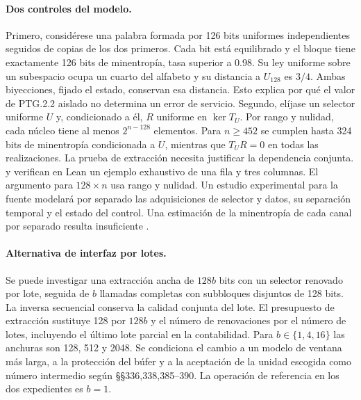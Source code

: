 \paragraph{Dos controles del modelo.}
Primero, considérese una palabra formada por 126 bits uniformes independientes
seguidos de copias de los dos primeros. Cada bit está equilibrado y el bloque
tiene exactamente 126 bits de minentropía, tasa superior a 0.98.
Su ley uniforme sobre un subespacio ocupa un cuarto del alfabeto y su distancia
a \(U_{128}\) es \(3/4\). Ambas biyecciones, fijado el estado, conservan esa
distancia. Esto explica por qué el valor de PTG.2.2 aislado no determina
un error de servicio. Segundo, elíjase un selector uniforme \(U\) y,
condicionado a él, \(R\) uniforme en \(\ker T_U\).
Por rango y nulidad, cada núcleo tiene al menos \(2^{n-128}\) elementos.
Para \(n\ge452\) se cumplen hasta 324 bits de minentropía condicionada
a \(U\), mientras que \(T_UR=0\) en todas las realizaciones. La prueba de
extracción necesita justificar la dependencia conjunta. 
y  verifican en Lean un ejemplo exhaustivo
de una fila y tres columnas. El argumento para \(128\times n\) usa rango y
nulidad. Un estudio experimental para la fuente modelará por separado las
adquisiciones de selector y datos, su separación temporal y el estado del
control. Una estimación de la minentropía de cada canal por separado
resulta insuficiente \cite[§§335, 338 y 951--955]{ais}\cite{lhl}.

\paragraph{Alternativa de interfaz por lotes.}
Se puede investigar una extracción ancha de \(128b\) bits con un selector
renovado por lote, seguida de \(b\) llamadas completas con subbloques
disjuntos de 128 bits. La inversa secuencial conserva la calidad conjunta
del lote. El presupuesto de extracción sustituye 128 por \(128b\) y el
número de renovaciones por el número de lotes, incluyendo el último lote
parcial en la contabilidad. Para \(b\in\{1,4,16\}\) las anchuras son 128,
512 y 2048. Se condiciona el cambio a un modelo de ventana más larga, a la
protección del búfer y a la aceptación de la unidad escogida como número
intermedio según §§336,338,385--390. La operación de referencia en los dos
expedientes es \(b=1\).

